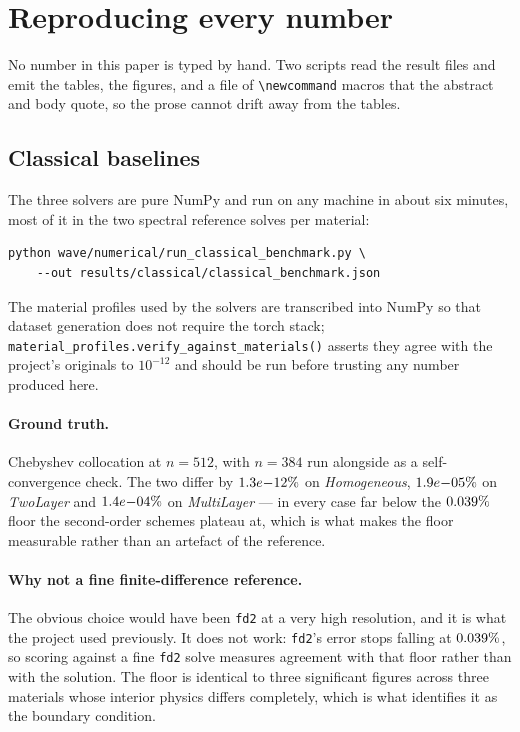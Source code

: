\section{Reproducing every number}
\label{app:repro}

No number in this paper is typed by hand. Two scripts read the result files and
emit the tables, the figures, and a file of \verb|\newcommand| macros that the
abstract and body quote, so the prose cannot drift away from the tables.

\subsection{Classical baselines}

The three solvers are pure NumPy and run on any machine in about six minutes,
most of it in the two spectral reference solves per material:

\begin{verbatim}
python wave/numerical/run_classical_benchmark.py \
    --out results/classical/classical_benchmark.json
\end{verbatim}

The material profiles used by the solvers are transcribed into NumPy so that
dataset generation does not require the torch stack;
\verb|material_profiles.verify_against_materials()| asserts they agree with the
project's originals to $10^{-12}$ and should be run before trusting any number
produced here.

\paragraph{Ground truth.} Chebyshev collocation at $n = 512$, with $n = 384$
run alongside as a self-convergence check. The two differ by
$1.3e{-}12\%$ on \emph{Homogeneous},
$1.9e{-}05\%$ on \emph{TwoLayer} and
$1.4e{-}04\%$ on \emph{MultiLayer} --- in every case far below the
$0.039\%$ floor the second-order schemes plateau at, which is what makes the
floor measurable rather than an artefact of the reference.

\paragraph{Why not a fine finite-difference reference.} The obvious choice
would have been \texttt{fd2} at a very high resolution, and it is what the
project used previously. It does not work: \texttt{fd2}'s error stops falling
at $0.039\%$, so scoring against a fine \texttt{fd2} solve measures
agreement with that floor rather than with the solution. The floor is identical
to three significant figures across three materials whose interior physics
differs completely, which is what identifies it as the boundary condition.


